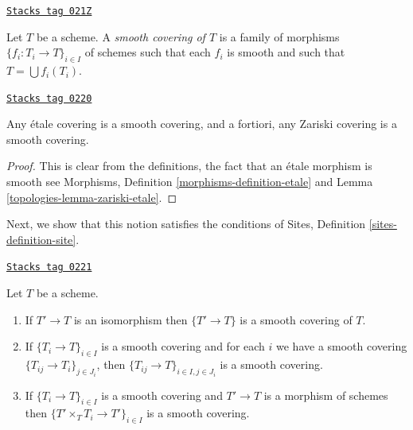 \begin{definition}
\label{topologies-definition-smooth-covering}
\href{https://stacks.math.columbia.edu/tag/021Z}{\texttt{Stacks tag 021Z}}

Let $T$ be a scheme. A {\it smooth covering of $T$} is a family
of morphisms $\{f_i : T_i \to T\}_{i \in I}$ of schemes
such that each $f_i$ is smooth and such
that $T = \bigcup f_i(T_i)$.
\end{definition}

\begin{lemma}
\label{topologies-lemma-zariski-etale-smooth}
\href{https://stacks.math.columbia.edu/tag/0220}{\texttt{Stacks tag 0220}}

Any \'etale covering is a smooth covering, and a fortiori,
any Zariski covering is a smooth covering.
\end{lemma}

\begin{proof}

This is clear from the definitions, the fact that an \'etale morphism is
smooth see
Morphisms, Definition \ref{morphisms-definition-etale}
and Lemma \ref{topologies-lemma-zariski-etale}.
\end{proof}

Next, we show that this notion satisfies the conditions of
Sites, Definition \ref{sites-definition-site}.

\begin{lemma}[Smooth]
\label{topologies-lemma-smooth}
\href{https://stacks.math.columbia.edu/tag/0221}{\texttt{Stacks tag 0221}}

Let $T$ be a scheme.
\begin{enumerate}
\item If $T' \to T$ is an isomorphism then $\{T' \to T\}$
is a smooth covering of $T$.
\item If $\{T_i \to T\}_{i\in I}$ is a smooth covering and for each
$i$ we have a smooth covering $\{T_{ij} \to T_i\}_{j\in J_i}$, then
$\{T_{ij} \to T\}_{i \in I, j\in J_i}$ is a smooth covering.
\item If $\{T_i \to T\}_{i\in I}$ is a smooth covering
and $T' \to T$ is a morphism of schemes then
$\{T' \times_T T_i \to T'\}_{i\in I}$ is a smooth covering.
\end{enumerate}
\end{lemma}


